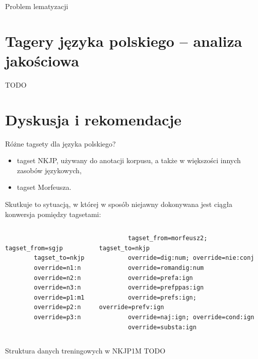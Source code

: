 \documentclass{beamer}
\begin{document}
\begin{frame}{Problem lematyzacji}
\end{frame}

\section{Tagery języka polskiego -- analiza jakościowa}
\frame{\sectionpage}

\begin{frame}{TODO}
\end{frame}

\section{Dyskusja i rekomendacje}
\frame{\sectionpage}

\begin{frame}[fragile]{Różne tagsety dla języka polskiego?}
  \begin{itemize}
    \item tagset NKJP, używany do anotacji korpusu, a także w większości innych zasobów językowych,
    \item tagset Morfeusza.
  \end{itemize}
  \vspace{0.5cm}

  Skutkuje to sytuacją, w której w sposób niejawny dokonywana jest ciągła konwersja pomiędzy tagsetami:
  \begin{columns}[c]
      \footnotesize
      \begin{verbatim}
        tagset_from=sgjp
        tagset_to=nkjp
        override=n1:n
        override=n2:n
        override=n3:n
        override=p1:m1
        override=p2:n
        override=p3:n
      \end{verbatim}
      \footnotesize
      \begin{verbatim}
        tagset_from=morfeusz2; tagset_to=nkjp
        override=dig:num; override=nie:conj
        override=romandig:num
        override=prefa:ign
        override=prefppas:ign
        override=prefs:ign; override=prefv:ign
        override=naj:ign; override=cond:ign
        override=substa:ign
      \end{verbatim}
    \end{columns}
\end{frame}

\begin{frame}{Struktura danych treningowych w NKJP1M}
  TODO
\end{frame}
\end{document}

